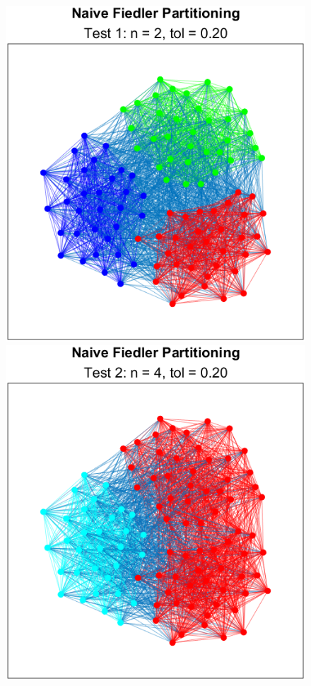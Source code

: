 \documentclass[11pt, letterpaper]{article}
\theoremstyle{perchance}
\begin{document}
    \begin{figure}[h!]
        \centering
        \begin{minipage}{.35\textwidth}
          \centering
          \includegraphics[width=0.95\linewidth]{images/naive1.png}
        \end{minipage}%
        \begin{minipage}{.35\textwidth}
          \centering
          \includegraphics[width=0.95\linewidth]{images/naive2.png}
        \end{minipage}
    \end{figure}
\end{document}
